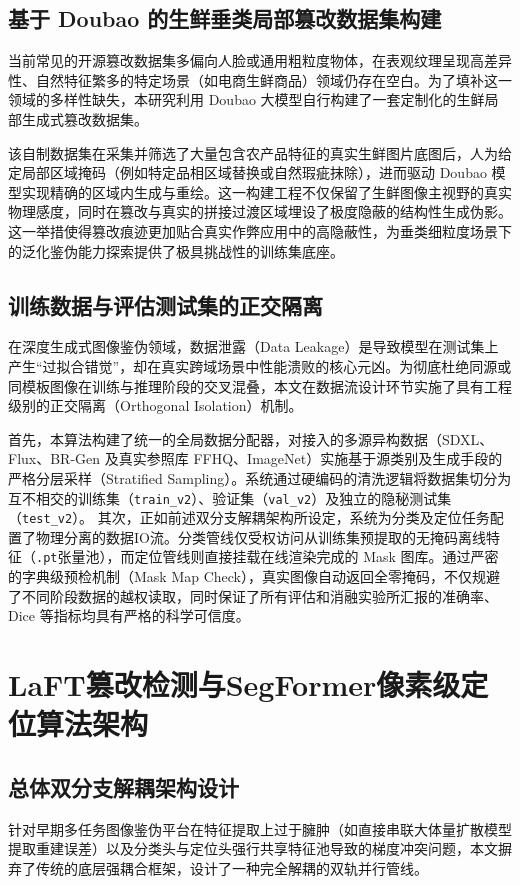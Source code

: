 \documentclass[UTF8, a4paper, 12pt]{ctexrep}
\begin{document}
\section{基于 Doubao 的生鲜垂类局部篡改数据集构建}
当前常见的开源篡改数据集多偏向人脸或通用粗粒度物体，在表观纹理呈现高差异性、自然特征繁多的特定场景（如电商生鲜商品）领域仍存在空白。为了填补这一领域的多样性缺失，本研究利用 Doubao 大模型自行构建了一套定制化的生鲜局部生成式篡改数据集。

该自制数据集在采集并筛选了大量包含农产品特征的真实生鲜图片底图后，人为给定局部区域掩码（例如特定品相区域替换或自然瑕疵抹除），进而驱动 Doubao 模型实现精确的区域内生成与重绘。这一构建工程不仅保留了生鲜图像主视野的真实物理感度，同时在篡改与真实的拼接过渡区域埋设了极度隐蔽的结构性生成伪影。这一举措使得篡改痕迹更加贴合真实作弊应用中的高隐蔽性，为垂类细粒度场景下的泛化鉴伪能力探索提供了极具挑战性的训练集底座。

\section{训练数据与评估测试集的正交隔离}
在深度生成式图像鉴伪领域，数据泄露（Data Leakage）是导致模型在测试集上产生“过拟合错觉”，却在真实跨域场景中性能溃败的核心元凶。为彻底杜绝同源或同模板图像在训练与推理阶段的交叉混叠，本文在数据流设计环节实施了具有工程级别的正交隔离（Orthogonal Isolation）机制。

首先，本算法构建了统一的全局数据分配器，对接入的多源异构数据（SDXL、Flux、BR-Gen 及真实参照库 FFHQ、ImageNet）实施基于源类别及生成手段的严格分层采样（Stratified Sampling）。系统通过硬编码的清洗逻辑将数据集切分为互不相交的训练集（\texttt{train\_v2}）、验证集（\texttt{val\_v2}）及独立的隐秘测试集（\texttt{test\_v2}）。
其次，正如前述双分支解耦架构所设定，系统为分类及定位任务配置了物理分离的数据IO流。分类管线仅受权访问从训练集预提取的无掩码离线特征（\texttt{.pt}张量池），而定位管线则直接挂载在线渲染完成的 Mask 图库。通过严密的字典级预检机制（Mask Map Check），真实图像自动返回全零掩码，不仅规避了不同阶段数据的越权读取，同时保证了所有评估和消融实验所汇报的准确率、Dice 等指标均具有严格的科学可信度。


\chapter{LaFT篡改检测与SegFormer像素级定位算法架构}

\section{总体双分支解耦架构设计}
针对早期多任务图像鉴伪平台在特征提取上过于臃肿（如直接串联大体量扩散模型提取重建误差）以及分类头与定位头强行共享特征池导致的梯度冲突问题，本文摒弃了传统的底层强耦合框架，设计了一种完全解耦的双轨并行管线。
\end{document}
